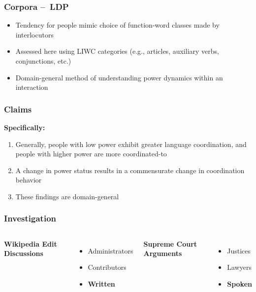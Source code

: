 \documentclass{beamer}
\begin{document}
\begin{frame}
\frametitle{Corpora – LDP}
\begin{itemize}
	\item Tendency for people mimic choice of function-word classes made by interlocutors
	\item Assessed here using LIWC categories (e.g., articles, auxiliary verbs, conjunctions, etc.)
	\item Domain-general method of understanding power dynamics within an interaction 
\end{itemize}
\end{frame}
\begin{frame}
\frametitle{Claims}
\textbf{Specifically:}
\begin{enumerate}
	\item Generally, people with low power exhibit greater language coordination, and people with higher power are more coordinated-to

	\item A change in power status results in a commensurate change in coordination behavior 

	\item These findings are domain-general
\end{enumerate}
\end{frame}
\begin{frame}
\frametitle{Investigation}
\begin{columns}[c]
\textbf{Wikipedia Edit Discussions}
\begin{itemize}
	\item Administrators
	\item Contributors
	\item \textbf{Written}
\end{itemize}

\textbf{Supreme Court Arguments}
\begin{itemize}
	\item Justices
	\item Lawyers
	\item \textbf{Spoken}
\end{itemize}
\end{columns}

\end{frame}
\end{document}
